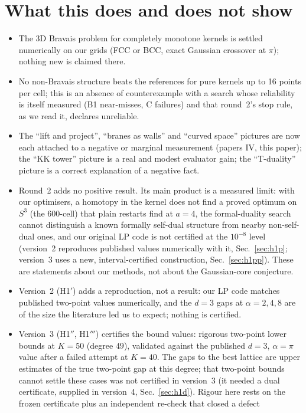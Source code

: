 \documentclass[11pt,a4paper]{article}
\begin{document}
\section{What this does and does not show}
\begin{itemize}[leftmargin=1.2em,itemsep=1pt]
\item The 3D Bravais problem for completely monotone kernels is settled numerically on our grids (FCC or BCC, exact Gaussian
crossover at $\pi$); nothing new is claimed there.
\item No non-Bravais structure beats the references for pure kernels up to 16 points per cell; this is an absence of counterexample
with a search whose reliability is itself measured (B1 near-misses, C failures) and that round~2's stop rule, as we read it, declares unreliable.
\item The ``lift and project'', ``branes as walls'' and ``curved space'' pictures are now each attached to a negative or marginal
measurement (papers IV, this paper); the ``KK tower'' picture is a real and modest evaluator gain; the ``T-duality'' picture is a
correct explanation of a negative fact.
\item Round~2 adds no positive result. Its main product is a measured limit: with our optimisers, a homotopy in the kernel does
not find a proved optimum on $S^3$ (the 600-cell) that plain restarts find at $a=4$, the formal-duality search cannot distinguish a known
formally self-dual structure from nearby non-self-dual ones, and our original LP code is not certified at the $10^{-8}$ level (version~2 reproduces published values numerically with it, Sec.~\ref{sec:h1p}; version~3 uses a new, interval-certified construction, Sec.~\ref{sec:h1pp}).
These are statements about our methods, not about the Gaussian-core conjecture.
\item Version~2 (H1$'$) adds a reproduction, not a result: our LP code matches published two-point values numerically, and
the $d=3$ gaps at $\alpha=2,4,8$ are of the size the literature led us to expect; nothing is certified.
\item Version~3 (H1$''$, H1$'''$) certifies the bound values: rigorous two-point lower bounds at $K=50$ (degree $49$),
validated against the published $d=3$, $\alpha=\pi$ value after a failed attempt at $K=40$. The gaps to the best lattice are
upper estimates of the true two-point gap at this degree; that two-point bounds cannot settle these cases was not certified in version~3 (it
needed a dual certificate, supplied in version~4, Sec.~\ref{sec:h1d}). Rigour here rests on the frozen certificate plus an independent re-check that closed a defect

\end{itemize}
\end{document}
